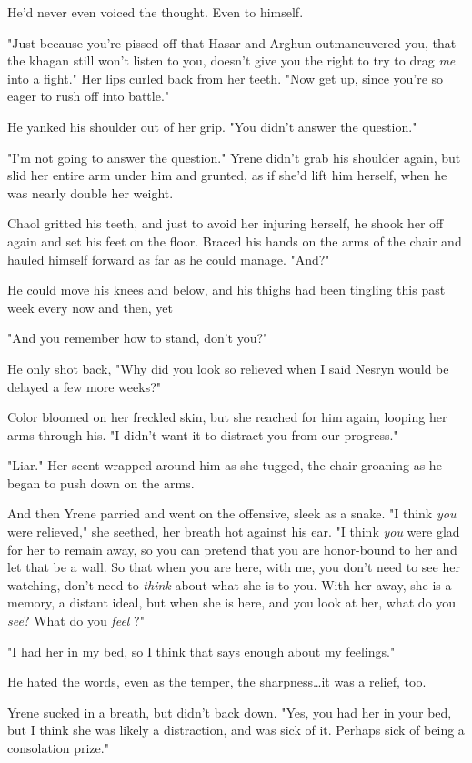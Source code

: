 He'd never even voiced the thought.
Even to himself.

"Just because you're pissed off that Hasar and Arghun outmaneuvered you, that the khagan still won't listen to you, doesn't give you the right to try to drag \emph{me} into a fight."
Her lips curled back from her teeth.
"Now get up, since you're so eager to rush off into battle."

He yanked his shoulder out of her grip.
"You didn't answer the question."

"I'm not going to answer the question."
Yrene didn't grab his shoulder again, but slid her entire arm under him and grunted, as if she'd lift him herself, when he was nearly double her weight.

Chaol gritted his teeth, and just to avoid her injuring herself, he shook her off again and set his feet on the floor.
Braced his hands on the arms of the chair and hauled himself forward as far as he could manage.
"And?"

He could move his knees and below, and his thighs had been tingling this past week every now and then, yet 

"And you remember how to stand, don't you?"

He only shot back, "Why did you look so relieved when I said Nesryn would be delayed a few more weeks?"

Color bloomed on her freckled skin, but she reached for him again, looping her arms through his.
"I didn't want it to distract you from our progress."

"Liar."
Her scent wrapped around him as she tugged, the chair groaning as he began to push down on the arms.

And then Yrene parried and went on the offensive, sleek as a snake.
"I think \emph{you} were relieved," she seethed, her breath hot against his ear.
"I think \emph{you} were glad for her to remain away, so you can pretend that you are honor-bound to her and let that be a wall.
So that when you are here, with me, you don't need to see her watching, don't need to \emph{think} about what she is to you.
With her away, she is a memory, a distant ideal, but when she is here, and you look at her, what do you \emph{see}?
What do you \emph{feel} ?"

"I had her in my bed, so I think that says enough about my feelings."

He hated the words, even as the temper, the sharpness\ldots it was a relief, too.

Yrene sucked in a breath, but didn't back down.
"Yes, you had her in your bed, but I think she was likely a distraction, and was sick of it.
Perhaps sick of being a consolation prize."

